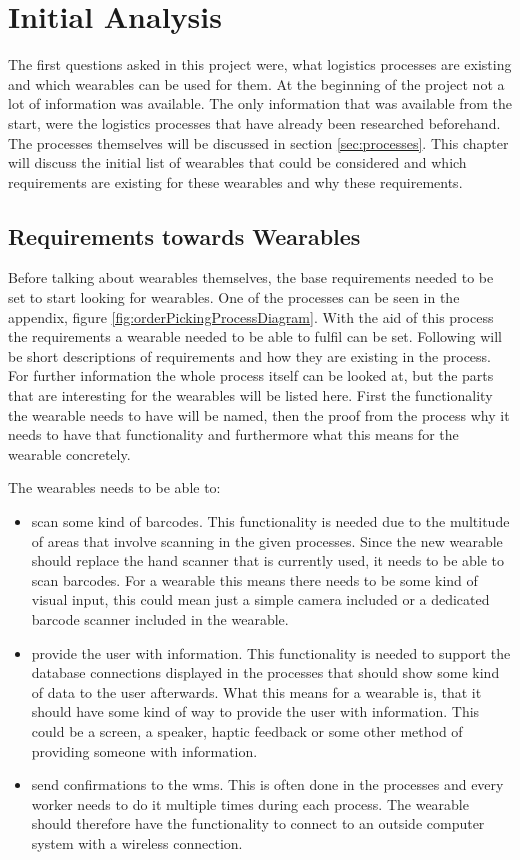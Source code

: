 \chapter{Initial Analysis}\label{cha:initialAnalysis}
The first questions asked in this project were, what logistics processes are existing and which wearables can be used for them. At the beginning of the project not a lot of information was available. The only information that was available from the start, were the logistics processes that have already been researched beforehand. The processes themselves will be discussed in section \ref{sec:processes}. This chapter will discuss the initial list of wearables that could be considered and which requirements are existing for these wearables and why these requirements.

\section{Requirements towards Wearables}\label{sec:reqTowardsWearables}
Before talking about wearables themselves, the base requirements needed to be set to start looking for wearables. One of the processes can be seen in the appendix, figure \ref{fig:orderPickingProcessDiagram}. With the aid of this process the requirements a wearable needed to be able to fulfil can be set. Following will be short descriptions of requirements and how they are existing in the process. For further information the whole process itself can be looked at, but the parts that are interesting for the wearables will be listed here. First the functionality the wearable needs to have will be named, then the proof from the process why it needs to have that functionality and furthermore what this means for the wearable concretely.

The wearables needs to be able to:
\begin{itemize}
	\item scan some kind of barcodes. This functionality is needed due to the multitude of areas that involve scanning in the given processes. Since the new wearable should replace the hand scanner that is currently used, it needs to be able to scan barcodes. For a wearable this means there needs to be some kind of visual input, this could mean just a simple camera included or a dedicated barcode scanner included in the wearable.
	\item provide the user with information. This functionality is needed to support the database connections displayed in the processes that should show some kind of data to the user afterwards. What this means for a wearable is, that it should have some kind of way to provide the user with information. This could be a screen, a speaker, haptic feedback or some other method of providing someone with information.
	\item send confirmations to the \gls{wms}. This is often done in the processes and every worker needs to do it multiple times during each process. The wearable should therefore have the functionality to connect to an outside computer system with a wireless connection.
\end{itemize} 

